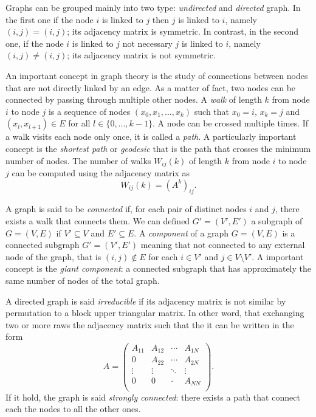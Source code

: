 Graphs can be grouped mainly into two type: \textit{undirected} and \textit{directed} graph. In the first one if the node $i$ is linked to $j$ then $j$ is linked to $i$, namely $(i, j) = (i, j)$; its adjacency matrix is symmetric.
In contrast, in the second one, if the node $i$ is linked to $j$ not necessary $j$ is linked to $i$, namely $(i, j) \neq (i, j)$; its adjacency matrix is not symmetric.

An important concept in graph theory is the study of connections between nodes that are not directly linked by an edge. As a matter of fact, two nodes can be connected by passing through multiple other nodes.
A \textit{walk} of length $k$ from node $i$ to node $j$ is a sequence of nodes $(x_0,x_1,...,x_k)$ such that $x_0=i$, $x_k=j$ and $(x_l, x_{l+1}) \in E$ for all $l \in \{0, ..., k-1\}$. A node can be crossed multiple times.  
If a walk visits each node only once, it is called a \textit{path}.
A particularly important concept is the \textit{shortest path} or \textit{geodesic} that is the path that crosses the minimum number of nodes.  
The number of walks $W_{ij}(k)$ of length $k$ from node $i$ to node $j$ can be computed using the adjacency matrix as
\begin{equation}
    W_{ij}(k) = (A^k)_{ij} .
\end{equation}

A graph is said to be \textit{connected} if, for each pair of distinct nodes $i$ and $j$, there exists a walk that connects them. 
We can defined $G' =(V',E')$ a subgraph of $G= (V,E)$ if $V' \subseteq V$ and $E' \subseteq E$.
A \textit{component} of a graph $G= (V,E)$ is a connected subgraph $G' =(V',E')$ meaning that not connected to any external node of the graph, that is $(i,j)\notin E$ for each $i\in V'$ and $j\in V\setminus V'$. 
A important concept is the \textit{giant component}: a connected subgraph that has approximately the same number of nodes of the total graph. 

A directed graph is said \textit{irreducible} if its adjacency matrix is not similar by permutation to a block upper triangular matrix. In other word, that exchanging two or more raws the adjacency matrix such that the it can be written in the form
\begin{equation}
    A = \begin{pmatrix}
        A_{11} & A_{12} & \cdots & A_{1N}\\
        0 & A_{22}& \cdots & A_{2N}\\
        \vdots & \vdots & \ddots & \vdots\\
        0 &0 &\cdot & A_{NN}\\
    \end{pmatrix} .
\end{equation}
If it hold, the graph is said \textit{strongly connected}: there exists a path that connect each the nodes to all the other ones.

